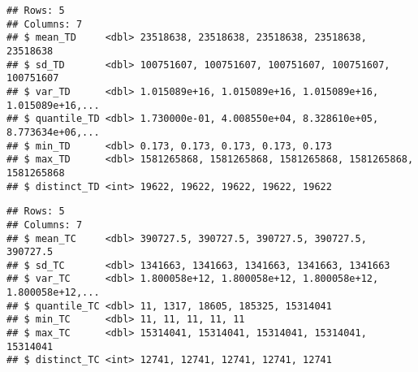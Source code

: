 \documentclass[
]{article}
\newenvironment{Shaded}{\begin{snugshade}}{\end{snugshade}}
\newcommand{\DataTypeTok}[1]{\textcolor[rgb]{0.13,0.29,0.53}{#1}}
\newcommand{\KeywordTok}[1]{\textcolor[rgb]{0.13,0.29,0.53}{\textbf{#1}}}
\newcommand{\NormalTok}[1]{#1}
\newcommand{\OperatorTok}[1]{\textcolor[rgb]{0.81,0.36,0.00}{\textbf{#1}}}
\newcommand{\StringTok}[1]{\textcolor[rgb]{0.31,0.60,0.02}{#1}}
\begin{document}
\begin{verbatim}
## Rows: 5
## Columns: 7
## $ mean_TD     <dbl> 23518638, 23518638, 23518638, 23518638, 23518638
## $ sd_TD       <dbl> 100751607, 100751607, 100751607, 100751607, 100751607
## $ var_TD      <dbl> 1.015089e+16, 1.015089e+16, 1.015089e+16, 1.015089e+16,...
## $ quantile_TD <dbl> 1.730000e-01, 4.008550e+04, 8.328610e+05, 8.773634e+06,...
## $ min_TD      <dbl> 0.173, 0.173, 0.173, 0.173, 0.173
## $ max_TD      <dbl> 1581265868, 1581265868, 1581265868, 1581265868, 1581265868
## $ distinct_TD <int> 19622, 19622, 19622, 19622, 19622
\end{verbatim}

\begin{Shaded}
\end{Shaded}

\begin{verbatim}
## Rows: 5
## Columns: 7
## $ mean_TC     <dbl> 390727.5, 390727.5, 390727.5, 390727.5, 390727.5
## $ sd_TC       <dbl> 1341663, 1341663, 1341663, 1341663, 1341663
## $ var_TC      <dbl> 1.800058e+12, 1.800058e+12, 1.800058e+12, 1.800058e+12,...
## $ quantile_TC <dbl> 11, 1317, 18605, 185325, 15314041
## $ min_TC      <dbl> 11, 11, 11, 11, 11
## $ max_TC      <dbl> 15314041, 15314041, 15314041, 15314041, 15314041
## $ distinct_TC <int> 12741, 12741, 12741, 12741, 12741
\end{verbatim}
\end{document}
